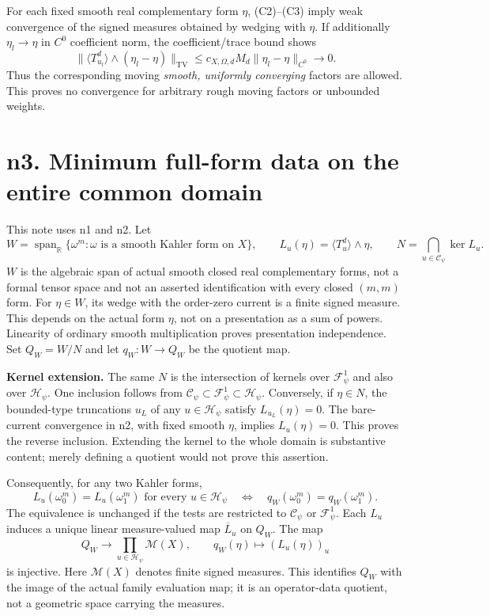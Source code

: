 \documentclass[
  11pt,
]{article}
\begin{document}
For each fixed smooth real complementary form \(\eta\), (C2)--(C3) imply
weak convergence of the signed measures obtained by wedging with
\(\eta\). If additionally \(\eta_l\to\eta\) in \(C^0\) coefficient norm,
the coefficient/trace bound shows \[
\|\langle T_{u_l}^d\rangle\wedge(\eta_l-\eta)\|_{\mathrm{TV}}
\leq c_{X,\Omega,d}M_d\|\eta_l-\eta\|_{C^0}\longrightarrow0.
\] Thus the corresponding moving \emph{smooth, uniformly converging}
factors are allowed. This proves no convergence for arbitrary rough
moving factors or unbounded weights.

\section{n3. Minimum full-form data on the entire common
domain}\label{n3.-minimum-full-form-data-on-the-entire-common-domain}

This note uses n1 and n2. Let \[
W=\operatorname{span}_{\mathbb R}\{\omega^m:\omega\text{ is a smooth Kahler form on }X\},
\qquad L_u(\eta)=\langle T_u^d\rangle\wedge\eta,
\qquad N=\bigcap_{u\in\mathcal C_\psi}\ker L_u.
\] \(W\) is the algebraic span of actual smooth closed real
complementary forms, not a formal tensor space and not an asserted
identification with every closed \((m,m)\) form. For \(\eta\in W\), its
wedge with the order-zero current is a finite signed measure. This
depends on the actual form \(\eta\), not on a presentation as a sum of
powers. Linearity of ordinary smooth multiplication proves presentation
independence. Set \(Q_W=W/N\) and let \(q_W:W\to Q_W\) be the quotient
map.

\textbf{Kernel extension.} The same \(N\) is the intersection of kernels
over \(\mathcal F^1_\psi\) and also over \(\mathcal H_\psi\). One
inclusion follows from
\(\mathcal C_\psi\subset\mathcal F^1_\psi\subset\mathcal H_\psi\).
Conversely, if \(\eta\in N\), the bounded-type truncations \(u_L\) of
any \(u\in\mathcal H_\psi\) satisfy \(L_{u_L}(\eta)=0\). The
bare-current convergence in n2, with fixed smooth \(\eta\), implies
\(L_u(\eta)=0\). This proves the reverse inclusion. Extending the kernel
to the whole domain is substantive content; merely defining a quotient
would not prove this assertion.

Consequently, for any two Kahler forms, \[
L_u(\omega_0^m)=L_u(\omega_1^m)\text{ for every }u\in\mathcal H_\psi
\quad\Longleftrightarrow\quad
q_W(\omega_0^m)=q_W(\omega_1^m). \tag{Q1}
\] The equivalence is unchanged if the tests are restricted to
\(\mathcal C_\psi\) or \(\mathcal F^1_\psi\). Each \(L_u\) induces a
unique linear measure-valued map \(\overline L_u\) on \(Q_W\). The map
\[
Q_W\longrightarrow\prod_{u\in\mathcal H_\psi}\mathcal M(X),\qquad
q_W(\eta)\longmapsto(L_u(\eta))_u
\] is injective. Here \(\mathcal M(X)\) denotes finite signed measures.
This identifies \(Q_W\) with the image of the actual family evaluation
map; it is an operator-data quotient, not a geometric space carrying the
measures.
\end{document}
